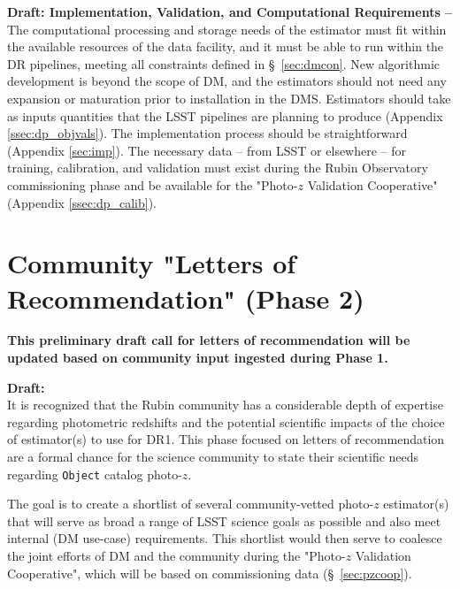 \documentclass[DM,lsstdraft,toc]{lsstdoc}
\begin{document}
{\bf Draft: Implementation, Validation, and Computational Requirements --}
The computational processing and storage needs of the estimator must fit within the available resources of the data facility, and it must be able to run within the DR pipelines, meeting all constraints defined in \S~\ref{sec:dmcon}. 
New algorithmic development is beyond the scope of DM, and the estimators should not need any expansion or maturation prior to installation in the DMS.
Estimators should take as inputs quantities that the LSST pipelines are planning to produce (Appendix \ref{ssec:dp_objvals}).
The implementation process should be straightforward (Appendix \ref{sec:imp}).
The necessary data -- from LSST or elsewhere -- for training, calibration, and validation must exist during the Rubin Observatory commissioning phase and be available for the "Photo-$z$ Validation Cooperative" (Appendix \ref{ssec:dp_calib}).



\clearpage
\section{Community "Letters of Recommendation" (Phase 2)} \label{sec:lor}

\textbf{This preliminary draft call for letters of recommendation will be updated based on community input ingested during Phase 1.}

\textbf{Draft:} \\
It is recognized that the Rubin community has a considerable depth of expertise regarding photometric redshifts and the potential scientific impacts of the choice of estimator(s) to use for DR1.
This phase focused on letters of recommendation are a formal chance for the science community to state their scientific needs regarding {\tt Object} catalog photo-$z$.

The goal is to create a shortlist of several community-vetted photo-$z$ estimator(s) that will serve as broad a range of LSST science goals as possible and also meet internal (DM use-case) requirements.
This shortlist would then serve to coalesce the joint efforts of DM and the community during the  "Photo-$z$ Validation Cooperative", which will be based on commissioning data (\S~\ref{sec:pzcoop}). 
\end{document}

